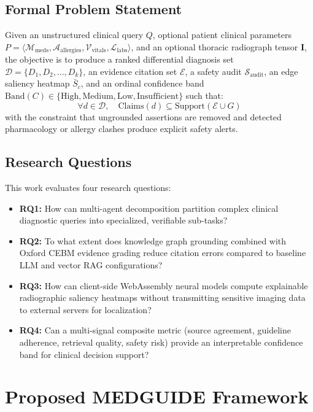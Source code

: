 \documentclass[journal,10pt,twocolumn]{IEEEtran}
\begin{document}
\subsection{Formal Problem Statement}
Given an unstructured clinical query $Q$, optional patient clinical parameters $P = \langle \mathcal{M}_{\text{meds}}, \mathcal{A}_{\text{allergies}}, \mathcal{V}_{\text{vitals}}, \mathcal{L}_{\text{labs}} \rangle$, and an optional thoracic radiograph tensor $\mathbf{I}$, the objective is to produce a ranked differential diagnosis set $\mathcal{D} = \{D_1, D_2, \dots, D_k\}$, an evidence citation set $\mathcal{E}$, a safety audit $\mathcal{S}_{\text{audit}}$, an edge saliency heatmap $\bar{S}_c$, and an ordinal confidence band $\text{Band}(C) \in \{\text{High}, \text{Medium}, \text{Low}, \text{Insufficient}\}$ such that:
\begin{equation}
\forall d \in \mathcal{D}, \quad \text{Claims}(d) \subseteq \text{Support}(\mathcal{E} \cup G)
\end{equation}
with the constraint that ungrounded assertions are removed and detected pharmacology or allergy clashes produce explicit safety alerts.

\subsection{Research Questions}
This work evaluates four research questions:
\begin{itemize}
    \item \textbf{RQ1:} How can multi-agent decomposition partition complex clinical diagnostic queries into specialized, verifiable sub-tasks?
    \item \textbf{RQ2:} To what extent does knowledge graph grounding combined with Oxford CEBM evidence grading reduce citation errors compared to baseline LLM and vector RAG configurations?
    \item \textbf{RQ3:} How can client-side WebAssembly neural models compute explainable radiographic saliency heatmaps without transmitting sensitive imaging data to external servers for localization?
    \item \textbf{RQ4:} Can a multi-signal composite metric (source agreement, guideline adherence, retrieval quality, safety risk) provide an interpretable confidence band for clinical decision support?
\end{itemize}

\section{Proposed MEDGUIDE Framework}
\end{document}
